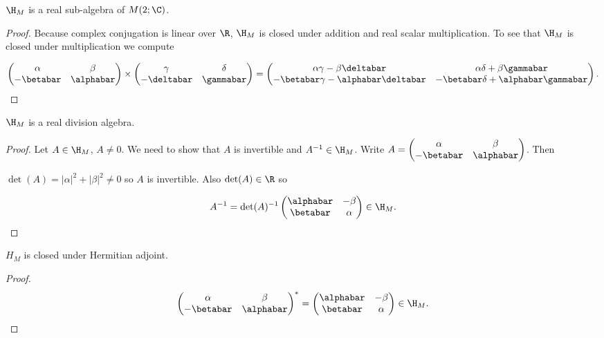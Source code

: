 \documentclass[oneside,12pt]{amsart}
\begin{document}
\begin{lemma} $\H_M$  is a real sub-algebra of $M(2; \C)$.
\end{lemma}
\begin{proof}
Because complex conjugation is linear over $\R$, $\H_M$ is closed under addition and real scalar multiplication.
To see that $\H_M$ is closed under multiplication we compute 

\begin{equation}
\label{eq:matrixmult}
\begin{pmatrix}
\alpha & \beta \\
-\betabar & \alphabar
\end{pmatrix}
\times
\begin{pmatrix}
\gamma & \delta \\
-\deltabar & \gammabar
\end{pmatrix} 
= 
\begin{pmatrix}
\alpha\gamma - \beta\deltabar & \alpha\delta + \beta\gammabar \\
-\betabar\gamma -\alphabar\deltabar & -\betabar\delta + \alphabar\gammabar
\end{pmatrix} .
\end{equation}
\end{proof}

\begin{lemma}  $\H_M$ is a real division algebra.
\end{lemma}
\begin{proof}
Let $A\in \H_M$, $A\not=0$. We need to show that $A$ is invertible and $A^{-1}\in \H_M$.
Write $A = \begin{pmatrix}
\alpha & \beta \\
-\betabar & \alphabar
\end{pmatrix}$. Then

$\det(A) = |\alpha|^2 + |\beta|^2 \not = 0$ so $A$ is invertible.
Also $\det(A)\in\R$ so

$$A^{-1} = \det(A)^{-1} \begin{pmatrix}
\alphabar & -\beta \\
\betabar & \alpha
\end{pmatrix} \in \H_M.$$

\end{proof}

\begin{lemma}
$H_M$ is closed under Hermitian adjoint.
\end{lemma}
\begin{proof}
\begin{equation}
\label{eq:quaternion_matrix_adjoint}
\begin{pmatrix}
\alpha & \beta \\
-\betabar & \alphabar
\end{pmatrix}^{*}=
\begin{pmatrix}
\alphabar & -\beta \\
\betabar & \alpha
\end{pmatrix}\in \H_M.
\end{equation}
\end{proof}
\end{document}

